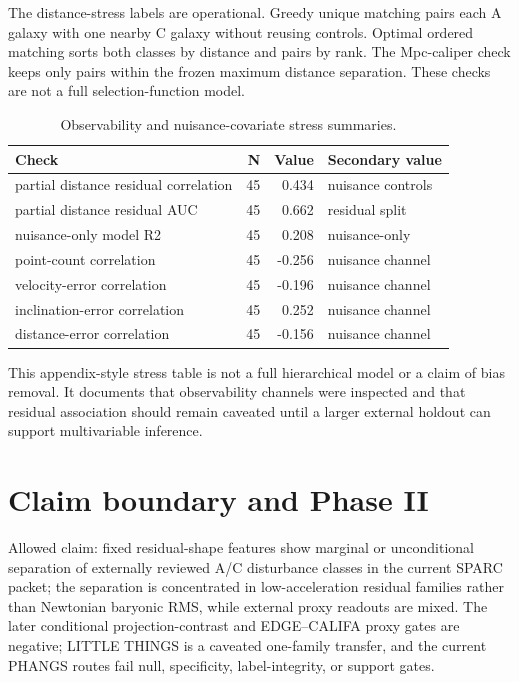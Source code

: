 \documentclass[11pt]{article}
\begin{document}
The distance-stress labels are operational. Greedy unique matching pairs each A galaxy with one nearby C galaxy without reusing controls. Optimal ordered matching sorts both classes by distance and pairs by rank. The Mpc-caliper check keeps only pairs within the frozen maximum distance separation. These checks are not a full selection-function model.

\begin{table}[H]
\centering
\caption{Observability and nuisance-covariate stress summaries.}
\footnotesize
\begin{tabular}{lrrl}
\toprule
Check & N & Value & Secondary value\\
\midrule
partial distance residual correlation & 45 & 0.434 & nuisance controls\\
partial distance residual AUC & 45 & 0.662 & residual split\\
nuisance-only model R2 & 45 & 0.208 & nuisance-only\\
point-count correlation & 45 & -0.256 & nuisance channel\\
velocity-error correlation & 45 & -0.196 & nuisance channel\\
inclination-error correlation & 45 & 0.252 & nuisance channel\\
distance-error correlation & 45 & -0.156 & nuisance channel\\
\bottomrule
\end{tabular}
\end{table}

This appendix-style stress table is not a full hierarchical model or a claim of bias removal. It documents that observability channels were inspected and that residual association should remain caveated until a larger external holdout can support multivariable inference.

\section{Claim boundary and Phase II}

Allowed claim: fixed residual-shape features show marginal or unconditional separation of externally reviewed A/C disturbance classes in the current SPARC packet; the separation is concentrated in low-acceleration residual families rather than Newtonian baryonic RMS, while external proxy readouts are mixed. The later conditional projection-contrast and EDGE--CALIFA proxy gates are negative; LITTLE THINGS is a caveated one-family transfer, and the current PHANGS routes fail null, specificity, label-integrity, or support gates.
\end{document}
